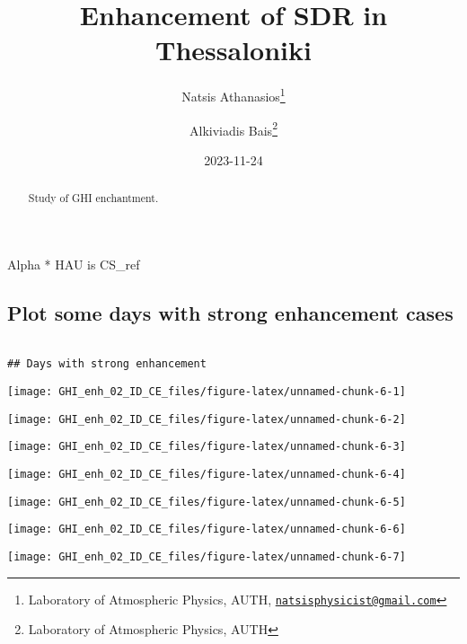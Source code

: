 \documentclass[
  10pt,
  a4paper,oneside]{article}
\title{Enhancement of SDR in Thessaloniki}
\author{Natsis Athanasios\footnote{Laboratory of Atmospheric Physics, AUTH, \href{mailto:natsisphysicist@gmail.com}{\nolinkurl{natsisphysicist@gmail.com}}} \and Alkiviadis Bais\footnote{Laboratory of Atmospheric Physics, AUTH}}
\date{2023-11-24}
\begin{document}
\maketitle
\begin{abstract}
Study of GHI enchantment.
\end{abstract}

{
\hypersetup{linkcolor=}
\setcounter{tocdepth}{4}
\tableofcontents
}
Alpha * HAU is CS\_ref

\hypertarget{plot-some-days-with-strong-enhancement-cases}{%
\subsection{Plot some days with strong enhancement cases}\label{plot-some-days-with-strong-enhancement-cases}}

\begin{verbatim}

## Days with strong enhancement 
\end{verbatim}

\begin{center}\texttt{[image: GHI\_enh\_02\_ID\_CE\_files/figure-latex/unnamed-chunk-6-1]} \end{center}

\begin{center}\texttt{[image: GHI\_enh\_02\_ID\_CE\_files/figure-latex/unnamed-chunk-6-2]} \end{center}

\begin{center}\texttt{[image: GHI\_enh\_02\_ID\_CE\_files/figure-latex/unnamed-chunk-6-3]} \end{center}

\begin{center}\texttt{[image: GHI\_enh\_02\_ID\_CE\_files/figure-latex/unnamed-chunk-6-4]} \end{center}

\begin{center}\texttt{[image: GHI\_enh\_02\_ID\_CE\_files/figure-latex/unnamed-chunk-6-5]} \end{center}

\begin{center}\texttt{[image: GHI\_enh\_02\_ID\_CE\_files/figure-latex/unnamed-chunk-6-6]} \end{center}

\begin{center}\texttt{[image: GHI\_enh\_02\_ID\_CE\_files/figure-latex/unnamed-chunk-6-7]} \end{center}
\end{document}
